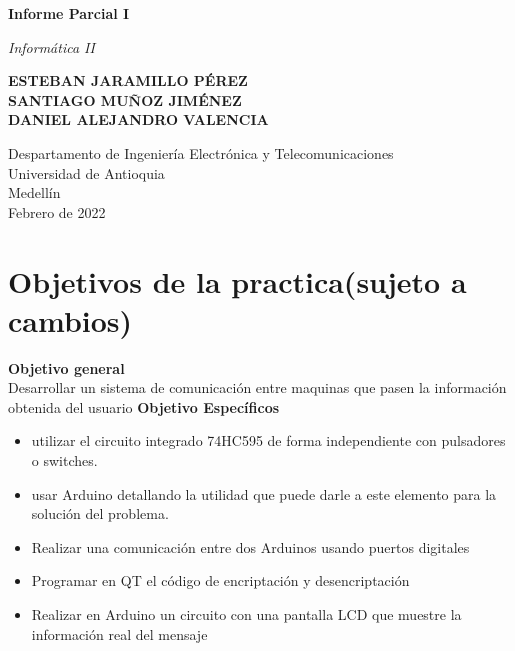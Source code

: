 \documentclass{article}
\begin{document}
\begin{titlepage}
    \begin{center}
        \vspace*{1cm}
        
        \Huge
        \textbf{Informe Parcial I}
            
        \vspace{0.5cm}
        \LARGE
       \textit{ Informática II}
            
        \vspace{1.5cm}
            
        \textbf{ESTEBAN JARAMILLO PÉREZ\\
        SANTIAGO MUÑOZ JIMÉNEZ\\
        DANIEL ALEJANDRO VALENCIA}
            
        \vfill
            
        \vspace{0.8cm}
            
        \Large
        Despartamento de Ingeniería Electrónica y Telecomunicaciones\\
        Universidad de Antioquia\\
        Medellín\\
        Febrero de 2022
            
    \end{center}
\end{titlepage}

\tableofcontents
\newpage
\newpage
\section{Objetivos de la practica(sujeto a cambios)}
\label{objetivos}
\textbf{Objetivo general}\\
Desarrollar un sistema de comunicación entre maquinas que pasen la información obtenida del usuario
\newline
\newline
\textbf{Objetivo Específicos}

\justify
\begin{itemize}

    \item utilizar el circuito integrado 74HC595 de forma independiente con pulsadores o switches.
    
    \item usar Arduino detallando la utilidad que puede darle a este elemento para la solución del problema.
    
    \item  Realizar una comunicación entre dos Arduinos usando puertos digitales

    \item Programar en QT el código de encriptación y desencriptación
    
    \item Realizar en Arduino un circuito con una pantalla LCD que muestre la información real del mensaje
    
   
    
\end{itemize}
\end{document}
